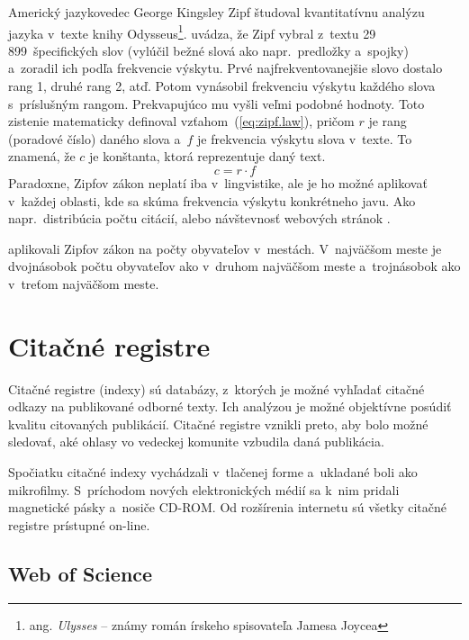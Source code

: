 Americký jazykovedec George Kingsley Zipf študoval kvantitatívnu analýzu jazyka
v~texte knihy Odysseus\footnote{ang. \emph{Ulysses} -- známy román írskeho
  spisovateľa Jamesa Joycea}.  \citet{Powers1998} uvádza, že Zipf vybral z~textu
29\,899~špecifických slov (vylúčil bežné slová ako napr.~predložky a~spojky)
a~zoradil ich podľa frekvencie výskytu.  Prvé najfrekventovanejšie slovo dostalo
rang 1, druhé rang 2, atď.  Potom vynásobil frekvenciu výskytu každého slova
s~príslušným rangom.  Prekvapujúco mu vyšli veľmi podobné hodnoty.  Toto
zistenie matematicky definoval vzťahom~(\ref{eq:zipf.law}), pričom $r$ je rang
(poradové číslo) daného slova a~$f$ je frekvencia výskytu slova v~texte.  To
znamená, že $c$ je konštanta, ktorá reprezentuje daný text.
\begin{equation}
\label{eq:zipf.law}
c = r \cdot f
\end{equation}
Paradoxne, Zipfov zákon neplatí iba v~lingvistike, ale je ho možné aplikovať
v~každej oblasti, kde sa skúma frekvencia výskytu konkrétneho javu.  Ako
napr.~distribúcia počtu citácií, alebo návštevnosť webových stránok
\citep{Li2002}.

\citet{Jiang2014} aplikovali Zipfov zákon na počty obyvateľov v~mestách.
V~najväčšom meste je dvojnásobok počtu obyvateľov ako v~druhom najväčšom meste
a~trojnásobok ako v~treťom najväčšom meste.



\section{Citačné registre}

Citačné registre (indexy) sú databázy, z~ktorých je možné vyhľadať citačné
odkazy na publikované odborné texty.  Ich analýzou je možné objektívne posúdiť
kvalitu citovaných publikácií.  Citačné registre vznikli preto, aby bolo možné
sledovať, aké ohlasy vo vedeckej komunite vzbudila daná publikácia.

Spočiatku citačné indexy vychádzali v~tlačenej forme a~ukladané boli ako
mikrofilmy.  S~príchodom nových elektronických médií sa k~nim pridali magnetické
pásky a~nosiče CD-ROM.  Od rozšírenia internetu sú všetky citačné registre
prístupné on-line.


\subsection{Web of Science}
\label{sec:wos}

